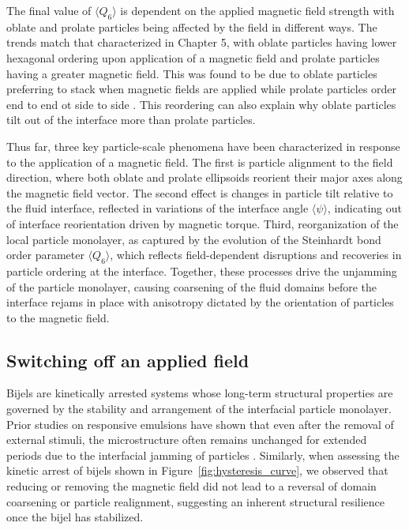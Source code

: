 The final value of \(\langle Q_6 \rangle\) is dependent on the applied magnetic field strength with oblate and prolate particles being affected by the field in
different ways. The trends match that characterized in Chapter 5, with oblate particles having lower hexagonal ordering upon application of a magnetic field
and prolate particles having a greater magnetic field. This was found to be due to oblate particles preferring to stack when magnetic fields are applied while
prolate particles order end to end ot side to side \cite{dabat_mesoscale_2018, eatson_capillary_2023}. This reordering can also explain why oblate particles
tilt out of the interface more than prolate particles.

Thus far, three key particle-scale phenomena have been characterized in response to the application of a magnetic field. The first is
particle alignment to the field direction, where both oblate and prolate ellipsoids reorient their major axes along the magnetic field vector. The second effect is
changes in particle tilt relative to the fluid interface, reflected in variations of the interface angle \(\langle \psi \rangle\), indicating out of interface 
reorientation driven by magnetic torque. Third, reorganization of the local particle monolayer, as captured by the evolution of the Steinhardt bond order parameter 
\(\langle Q_6 \rangle\), which reflects field-dependent disruptions and recoveries in particle ordering at the interface. Together, these processes 
drive the unjamming of the particle monolayer, causing coarsening of the fluid domains before the interface rejams in place with anisotropy dictated by the orientation
of particles to the magnetic field.

\subsection{Switching off an applied field}
\label{decreasing-the-applied-field}

Bijels are kinetically arrested systems whose long-term structural properties are governed by the stability and arrangement 
of the interfacial particle monolayer. Prior studies on responsive emulsions have shown that even after the removal of external 
stimuli, the microstructure often remains unchanged for extended periods due to the interfacial 
jamming of particles \cite{cui_stabilizing_2013}. Similarly, when assessing the kinetic arrest of bijels shown 
in Figure~\ref{fig:hysteresis_curve}, we observed that reducing or removing the magnetic field did not 
lead to a reversal of domain coarsening or particle realignment, suggesting an inherent structural resilience once the bijel 
has stabilized.

